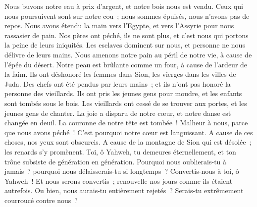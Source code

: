 \begin{multicols}{2}
Nous buvons notre eau à prix d'argent, et notre bois nous est vendu.
Ceux qui nous poursuivent sont sur notre cou~; nous sommes épuisés, nous n'avons pas de repos.
Nous avons étendu la main vers l'Egypte, et vers l'Assyrie pour nous rassasier de pain.
Nos pères ont péché, ils ne sont plus, et c'est nous qui portons la peine de leurs iniquités.
Les esclaves dominent sur nous, et personne ne nous délivre de leurs mains.
Nous amenons notre pain au péril de notre vie, à cause de l'épée du désert.
Notre peau est brûlante comme un four, à cause de l'ardeur de la faim.
Ils ont déshonoré les femmes dans Sion, les vierges dans les villes de Juda.
Des chefs ont été pendus par leurs mains~; et ils n'ont pas honoré la personne des vieillards.
Ils ont pris les jeunes gens pour moudre, et les enfants sont tombés sous le bois.
Les vieillards ont cessé de se trouver aux portes, et les jeunes gens de chanter.
La joie a disparu de notre cœur, et notre danse est changée en deuil.
La couronne de notre tête est tombée~! Malheur à nous, parce que nous avons péché~!
C'est pourquoi notre cœur est languissant. A cause de ces choses, nos yeux sont obscurcis.
A cause de la montagne de Sion qui est désolée~; les renards s'y promènent.
Toi, ô Yahweh, tu demeures éternellement, et ton trône subsiste de génération en génération.
Pourquoi nous oublierais-tu à jamais~? pourquoi nous délaisserais-tu si longtemps~?
Convertis-nous à toi, ô Yahweh~! Et nous serons convertis~; renouvelle nos jours comme ils étaient autrefois.
Ou bien, nous aurais-tu entièrement rejetés~? Serais-tu extrêmement courroucé contre nous~?
\PPE{}
\end{multicols}
